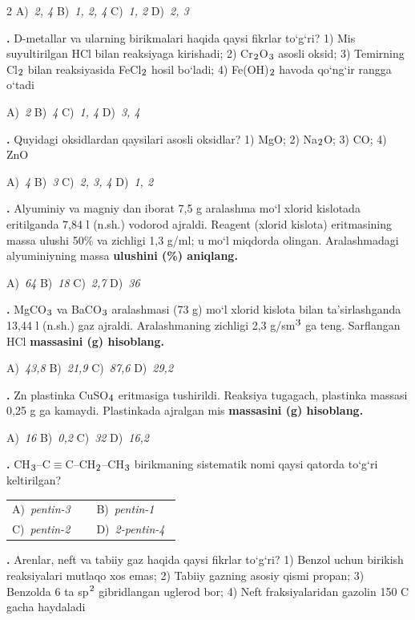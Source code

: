 \documentclass[11pt,a4paper]{article}
\renewcommand{\textsubscript}[1]{\ensuremath{_{\text{\fontsize{8}{8}\selectfont #1}}}}
\renewcommand{\textsuperscript}[1]{\ensuremath{^{\text{\fontsize{8}{8}\selectfont #1}}}}
\newcommand{\qn}[1]{\textbf{\fontsize{11.5}{13}\selectfont #1}}
\newcommand{\qsep}{\par\vspace{13pt}}
\begin{document}
\begin{multicols}{2}
\noindent A)~\textsl{2, 4} \hfill B)~\textsl{1, 2, 4} \hfill C)~\textsl{1, 2} \hfill D)~\textsl{2, 3}\par
\qsep
\noindent\qn{15.} D-metallar va ularning birikmalari haqida qaysi fikrlar to`g`ri? 1) Mis suyultirilgan HCl bilan reaksiyaga kirishadi; 2) Cr\textsubscript{2}O\textsubscript{3} asosli oksid; 3) Temirning Cl\textsubscript{2} bilan reaksiyasida FeCl\textsubscript{2} hosil bo`ladi; 4) Fe(OH)\textsubscript{2} havoda qo`ng`ir rangga o`tadi

\noindent A)~\textsl{2} \hfill B)~\textsl{4} \hfill C)~\textsl{1, 4} \hfill D)~\textsl{3, 4}\par
\qsep
\noindent\qn{16.} Quyidagi oksidlardan qaysilari asosli oksidlar? 1) MgO; 2) Na\textsubscript{2}O; 3) CO; 4) ZnO

\noindent A)~\textsl{4} \hfill B)~\textsl{3} \hfill C)~\textsl{2, 3, 4} \hfill D)~\textsl{1, 2}\par
\qsep
\noindent\qn{17.} Alyuminiy va magniy dan iborat 7,5 g aralashma mo`l xlorid kislotada eritilganda 7,84 l (n.sh.) vodorod ajraldi. Reagent (xlorid kislota) eritmasining massa ulushi 50\% va zichligi 1,3 g/ml; u mo`l miqdorda olingan. Aralashmadagi alyuminiyning massa \textbf{ulushini (\%) aniqlang.}

\noindent A)~\textsl{64} \hfill B)~\textsl{18} \hfill C)~\textsl{2,7} \hfill D)~\textsl{36}\par
\qsep
\noindent\qn{18.} MgCO\textsubscript{3} va BaCO\textsubscript{3} aralashmasi (73 g) mo`l xlorid kislota bilan ta'sirlashganda 13,44 l (n.sh.) gaz ajraldi. Aralashmaning zichligi 2,3 g/sm\textsuperscript{3} ga teng. Sarflangan HCl \textbf{massasini (g) hisoblang.}

\noindent A)~\textsl{43,8} \hfill B)~\textsl{21,9} \hfill C)~\textsl{87,6} \hfill D)~\textsl{29,2}\par
\qsep
\noindent\qn{19.} Zn plastinka CuSO\textsubscript{4} eritmasiga tushirildi. Reaksiya tugagach, plastinka massasi 0,25 g ga kamaydi. Plastinkada ajralgan mis \textbf{massasini (g) hisoblang.}

\noindent A)~\textsl{16} \hfill B)~\textsl{0,2} \hfill C)~\textsl{32} \hfill D)~\textsl{16,2}\par
\qsep
\noindent\qn{20.} CH\textsubscript{3}--C$\equiv$C--CH\textsubscript{2}--CH\textsubscript{3} birikmaning sistematik nomi qaysi qatorda to`g`ri keltirilgan?

\noindent\begin{tabular}{@{}p{0.47\linewidth}@{}p{0.47\linewidth}@{}}
A)~\textsl{pentin-3} & B)~\textsl{pentin-1} \\
C)~\textsl{pentin-2} & D)~\textsl{2-pentin-4} \\
\end{tabular}\par
\qsep
\noindent\qn{21.} Arenlar, neft va tabiiy gaz haqida qaysi fikrlar to`g`ri? 1) Benzol uchun birikish reaksiyalari mutlaqo xos emas; 2) Tabiiy gazning asosiy qismi propan; 3) Benzolda 6 ta sp\textsuperscript{2} gibridlangan uglerod bor; 4) Neft fraksiyalaridan gazolin 150 \textdegree{}C gacha haydaladi


\end{multicols}
\end{document}
